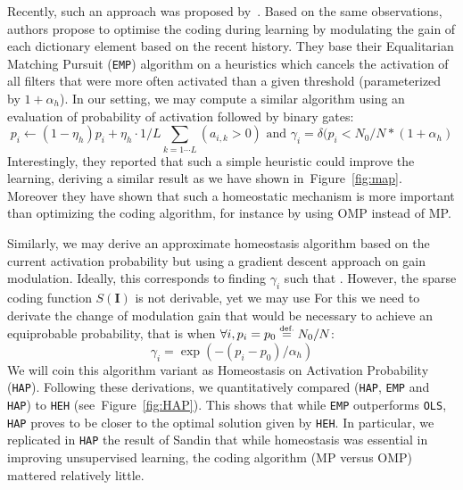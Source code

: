 \documentclass[a4paper, 11pt, draft]{article} %
\newcommand{\image}{\mathbf{I}} %
\newcommand{\eqdef}{\ensuremath{\stackrel{\mbox{\upshape\tiny def.}}{=}}}
\newcommand{\seeFig}[1]{Figure~\ref{fig:#1}}%
\begin{document}
Recently, such an approach was proposed by~\citet{Sandin17}. Based on the same observations, authors propose to optimise the coding during learning by modulating the gain of each dictionary element based on the recent history. They base their Equalitarian Matching Pursuit (\texttt{EMP}) algorithm on a heuristics which cancels the activation of all filters that were more often activated than a given threshold (parameterized by $1+\alpha_h$). In our setting, we may compute a similar algorithm using an evaluation of probability of activation followed by binary gates:
\begin{equation}%
p_i \leftarrow (1- \eta_h ) p_i + \eta_h \cdot 1/L\sum_{k=1\cdots L} (a_{i, k} > 0) \textrm{ and }
\gamma_i = \delta (p_i < N_0/N*(1+\alpha_h)
\end{equation}%
Interestingly, they reported that such a simple heuristic could improve the learning, deriving a similar result as we have shown in~\seeFig{map}. Moreover they have shown that such a homeostatic mechanism is more important than optimizing the coding algorithm, for instance by using OMP instead of MP.

Similarly, we may derive an approximate homeostasis algorithm based on the current activation probability but using a gradient descent approach on gain modulation. Ideally, this corresponds to finding $\gamma_i$ such that . However, the sparse coding function $S(\image)$ is not derivable, yet we may use
For this we need to derivate the change of modulation gain that would be necessary to achieve an equiprobable probability, that is when $\forall i, p_i = p_0 \eqdef N_0 / N$: %
\begin{equation}%
\gamma_i = \exp(-(p_i - p_0) / \alpha_h)
\end{equation}%
We will coin this algorithm variant as Homeostasis on Activation Probability (\texttt{HAP}). %
Following these derivations, we quantitatively compared (\texttt{HAP}, \texttt{EMP} and \texttt{HAP}) to \texttt{HEH} (see~\seeFig{HAP}). This shows that while \texttt{EMP} outperforms \texttt{OLS}, \texttt{HAP} proves to be closer to the optimal solution given by \texttt{HEH}.
In particular, we replicated in \texttt{HAP} the result of Sandin that while homeostasis was essential in improving unsupervised learning, the coding algorithm (MP versus OMP) mattered relatively little.
\end{document}
